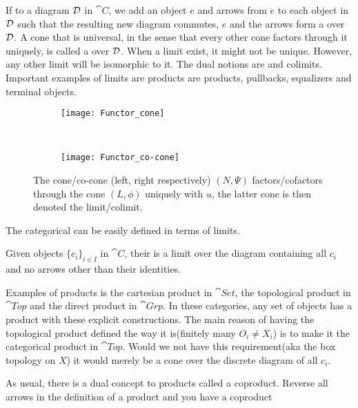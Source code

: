 \documentclass[../../main.tex]{subfiles}
\begin{document}
    If to a diagram $\mathcal{D}$ in $\cat{C}$, we add an object $e$ and arrows from $e$ to each object in $\mathcal{D}$ such that the resulting new diagram commutes, $e$ and the arrows form a  over $\mathcal{D}$. A cone that is universal, in the sense that every other cone factors through it uniquely, is called a  over $\mathcal{D}$. When a limit exist, it might not be unique. However, any other limit will be isomorphic to it. The dual notions are  and colimits. Important examples of limits are products are products, pullbacks, equalizers and terminal objects.
    
    \begin{figure}[H]
        \centering
        \begin{subfigure}[b]{0.5\textwidth}
            \centering
            \texttt{[image: Functor\_cone]}
            \caption{}
        \end{subfigure}%
        ~ 
        \begin{subfigure}[b]{0.5\textwidth}
            \centering
            \texttt{[image: Functor\_co-cone]}
            \caption{}
        \end{subfigure}
        \caption{The cone/co-cone (left, right respectively) $(N,\Psi)$ factors/cofactors through the cone $(L,\phi)$ uniquely with $u$, the latter cone is then denoted the limit/colimit.}
    \end{figure}
    
    The categorical  can be easily defined in terms of limits. 
    
    \begin{definition}
        Given objects $\{c_i\}_{i \in I}$ in $\cat{C}$, their  is a limit over the diagram containing all $c_i$ and no arrows other than their identities.
    \end{definition}
    
    Examples of products is the cartesian product in $\cat{Set}$, the topological product in $\cat{Top}$ and the direct product in $\cat{Grp}$. In these categories, any set of objects has a product with these explicit constructions. The main reason of having the topological product defined the way it is(finitely many $O_i \neq X_i$) is to make it the categorical product in $\cat{Top}$. Would we not have this requirement(aka the box topology on $X$) it would merely be a cone over the discrete diagram of all $c_i$.
    
    As usual, there is a dual concept to products called a coproduct. Reverse all arrows in the definition of a product and you have a coproduct
    
\end{document}

